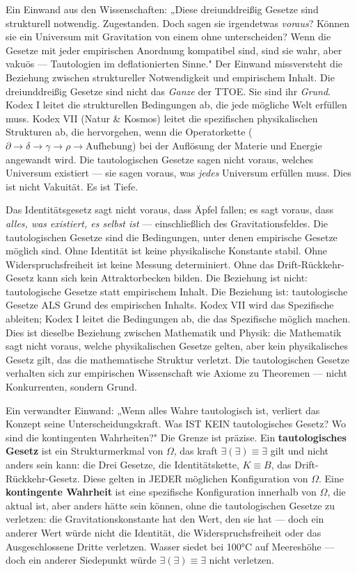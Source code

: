\documentclass[10pt, openany, oneside]{book}
\begin{document}
Ein Einwand aus den Wissenschaften: „Diese dreiunddreißig Gesetze sind strukturell notwendig. Zugestanden. Doch sagen sie irgendetwas \textit{voraus}? Können sie ein Universum mit Gravitation von einem ohne unterscheiden? Wenn die Gesetze mit jeder empirischen Anordnung kompatibel sind, sind sie wahr, aber vakuös --- Tautologien im deflationierten Sinne." Der Einwand missversteht die Beziehung zwischen struktureller Notwendigkeit und empirischem Inhalt. Die dreiunddreißig Gesetze sind nicht das \textit{Ganze} der TTOE. Sie sind ihr \textit{Grund}. Kodex I leitet die strukturellen Bedingungen ab, die jede mögliche Welt erfüllen muss. Kodex VII (Natur \& Kosmos) leitet die spezifischen physikalischen Strukturen ab, die hervorgehen, wenn die Operatorkette ($\partial \to \delta \to \gamma \to \rho \to \text{Aufhebung}$) bei der Auflösung der Materie und Energie angewandt wird. Die tautologischen Gesetze sagen nicht voraus, welches Universum existiert --- sie sagen voraus, was \textit{jedes} Universum erfüllen muss. Dies ist nicht Vakuität. Es ist Tiefe.

Das Identitätsgesetz sagt nicht voraus, dass Äpfel fallen; es sagt voraus, dass \textit{alles, was existiert, es selbst ist} --- einschließlich des Gravitationsfeldes. Die tautologischen Gesetze sind die Bedingungen, unter denen empirische Gesetze möglich sind. Ohne Identität ist keine physikalische Konstante stabil. Ohne Widerspruchsfreiheit ist keine Messung determiniert. Ohne das Drift-Rückkehr-Gesetz kann sich kein Attraktorbecken bilden. Die Beziehung ist nicht: tautologische Gesetze statt empirischem Inhalt. Die Beziehung ist: tautologische Gesetze ALS Grund des empirischen Inhalts. Kodex VII wird das Spezifische ableiten; Kodex I leitet die Bedingungen ab, die das Spezifische möglich machen. Dies ist dieselbe Beziehung zwischen Mathematik und Physik: die Mathematik sagt nicht voraus, welche physikalischen Gesetze gelten, aber kein physikalisches Gesetz gilt, das die mathematische Struktur verletzt. Die tautologischen Gesetze verhalten sich zur empirischen Wissenschaft wie Axiome zu Theoremen --- nicht Konkurrenten, sondern Grund.

Ein verwandter Einwand: „Wenn alles Wahre tautologisch ist, verliert das Konzept seine Unterscheidungskraft. Was IST KEIN tautologisches Gesetz? Wo sind die kontingenten Wahrheiten?" Die Grenze ist präzise. Ein \textbf{tautologisches Gesetz} ist ein Strukturmerkmal von $\Omega$, das kraft $\exists(\exists) \equiv \exists$ gilt und nicht anders sein kann: die Drei Gesetze, die Identitätskette, $K \equiv B$, das Drift-Rückkehr-Gesetz. Diese gelten in JEDER möglichen Konfiguration von $\Omega$. Eine \textbf{kontingente Wahrheit} ist eine spezifische Konfiguration innerhalb von $\Omega$, die aktual ist, aber anders hätte sein können, ohne die tautologischen Gesetze zu verletzen: die Gravitationskonstante hat den Wert, den sie hat --- doch ein anderer Wert würde nicht die Identität, die Widerspruchsfreiheit oder das Ausgeschlossene Dritte verletzen. Wasser siedet bei 100°C auf Meereshöhe --- doch ein anderer Siedepunkt würde $\exists(\exists) \equiv \exists$ nicht verletzen.
\end{document}
